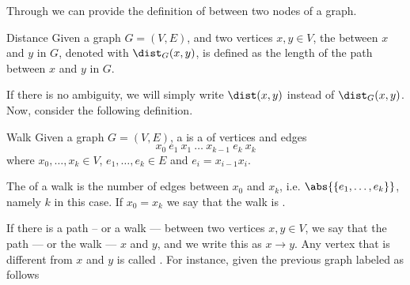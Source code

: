 \documentclass[a4paper, 12pt]{report}
\begin{document}
    Through  we can provide the definition of  between two nodes of a graph.

    \begin{frameddefn}{Distance}
        Given a graph $G = (V, E)$, and two vertices $x, y \in V$, the  between $x$ and $y$ in $G$, denoted with $\dist_G(x, y)$, is defined as the length of the  path between $x$ and $y$ in $G$.
    \end{frameddefn}

    If there is no ambiguity, we will simply write $\dist(x, y)$ instead of $\dist_G(x, y)$. Now, consider the following definition.

    \begin{frameddefn}{Walk}
        Given a graph $G = (V, E)$, a  is a  of vertices and edges $$x_0 \ e_1 \ x_1 \ \ldots \ x_{k - 1} \ e_k \ x_k$$ where $x_0, \ldots, x_k \in V$, $e_1, \ldots, e_k \in E$ and $e_i = x_{i - 1}x_i$.

        The  of a walk is the number of edges between $x_0$ and $x_k$, i.e. $\abs{\{e_1, \ldots , e_k \}}$, namely $k$ in this case. If $x_0 = x_k$ we say that the walk is .
    \end{frameddefn}

    If there is a path -- or a walk --- between two vertices $x, y \in V$, we say that the path --- or the walk ---  $x$ and $y$, and we write this as $x \to y$. Any vertex that is different from $x$ and $y$ is called . For instance, given the previous graph labeled as follows

    \begin{figure}[H]
        \centering
    \end{figure}
\end{document}
